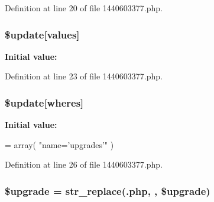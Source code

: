Definition at line 20 of file 1440603377.\+php.

\subsubsection[{\texorpdfstring{\$update}{$update}}]{\setlength{\rightskip}{0pt plus 5cm}\${\bf update}\mbox{[}\textquotesingle{}values\textquotesingle{}\mbox{]}}\hypertarget{1440603377_8php_ac82a75b4c6df37380ff77c88f041785e}{}\label{1440603377_8php_ac82a75b4c6df37380ff77c88f041785e}
{\bfseries Initial value\+:}


Definition at line 23 of file 1440603377.\+php.

\subsubsection[{\texorpdfstring{\$update}{$update}}]{\setlength{\rightskip}{0pt plus 5cm}\${\bf update}\mbox{[}\textquotesingle{}wheres\textquotesingle{}\mbox{]}}\hypertarget{1440603377_8php_aacde4479a904b32d0f24dea4e01f148c}{}\label{1440603377_8php_aacde4479a904b32d0f24dea4e01f148c}
{\bfseries Initial value\+:}
\begin{DoxyCode}
= array(
        \textcolor{stringliteral}{"name='upgrades'"}
)
\end{DoxyCode}


Definition at line 26 of file 1440603377.\+php.

\subsubsection[{\texorpdfstring{\$upgrade}{$upgrade}}]{\setlength{\rightskip}{0pt plus 5cm}\$upgrade = str\+\_\+replace(\textquotesingle{}.php\textquotesingle{}, \textquotesingle{}\textquotesingle{}, \$upgrade)}\hypertarget{1440603377_8php_a9084097ce600d3cc7a79a20ecaea9906}{}\label{1440603377_8php_a9084097ce600d3cc7a79a20ecaea9906}


